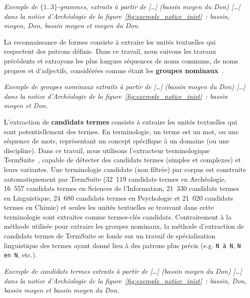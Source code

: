     \textit{Exemple de $\{1..3\}$-grammes, extraits à partir de \og{}[\dots]
    (bassin moyen du Don) [\dots]\fg{} dans la notice d'Archéologie de la
    figure~\ref{fig:exemple_notice_inist}~: \og{}bassin\fg{}, \og{}moyen\fg{},
    \og{}Don\fg{}, \og{}bassin moyen\fg{} et \og{}moyen du Don\fg{}}.

    La reconnaissance de formes consiste à extraire les unités textuelles qui
    respectent des patrons définis. Dans ce travail, nous suivons les travaux
    précédents et extrayons les plus longues séquences de noms communs, de noms
    propres et d'adjectifs, considérées comme étant les \textbf{groupes
    nominaux}~\cite{hassan2010conundrums}.
    
    \textit{Exemple de groupes nominaux extraits à partir de \og{}[\dots]
    (bassin moyen du Don) [\dots]\fg{} dans la notice d'Archéologie de la
    figure~\ref{fig:exemple_notice_inist}~: \og{}bassin moyen\fg{} et
    \og{}Don\fg{}.}

    L'extraction de \textbf{candidats termes} consiste à extraire les unités
    textuelles qui sont potentiellement des termes. En terminologie, un terme
    est un mot, ou une séquence de mots, représentant un concept spécifique à un
    domaine (ou une discipline). Dans ce travail, nous utilisons l'extracteur
    terminologique TermSuite~\cite{rocheteau2011termsuite}, capable de détecter
    des candidats termes (simples et complexes) et leurs variantes. Une
    terminologie candidate (non filtrée) par corpus est construite
    automatiquement par TermSuite (32~119 candidats termes en Archéologie,
    16~557 candidats termes en Sciences de l'Information, 21~330 candidats
    termes en Linguistique, 24~680 candidats termes en Psychologie et 21~020
    candidats termes en Chimie) et seules les unités textuelles se trouvant dans
    cette terminologie sont extraites comme termes-clés candidats. Contrairement
    à la méthode utilisée pour extraire les groupes nominaux, la méthode
    d'extraction de candidats termes de TermSuite se fonde sur un travail de
    spécialisation linguistique des termes ayant donné lieu à des patrons plus
    précis (e.g. \texttt{N à N}, \texttt{N en N}, etc.).
    
    \textit{Exemple de candidats termes extraits à partir de \og{}[\dots]
    (bassin moyen du Don) [\dots]\fg{} dans la notice d'Archéologie de la
    figure~\ref{fig:exemple_notice_inist}~: \og{}bassin\fg{}, \og{}Don\fg{},
    \og{}bassin moyen\fg{} et \og{}bassin moyen du Don\fg{}.}
    
